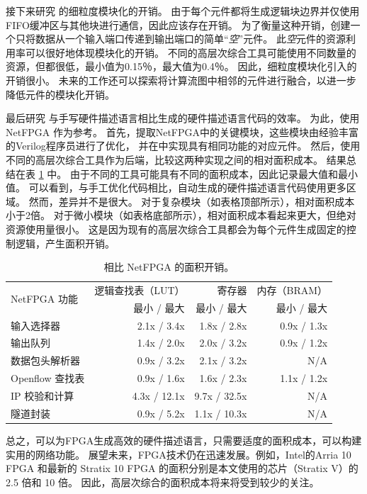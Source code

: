 接下来研究 \name 的细粒度模块化的开销。
由于每个元件都将生成逻辑块边界并仅使用FIFO缓冲区与其他块进行通信，因此应该存在开销。
为了衡量这种开销，创建一个只将数据从一个输入端口传递到输出端口的简单``\textit{空}''元件。
此\textit {空}元件的资源利用率可以很好地体现模块化的开销。
不同的高层次综合工具可能使用不同数量的资源，但都很低，最小值为0.15％，最大值为0.4％。
因此，细粒度模块化引入的开销很小。
未来的工作还可以探索将计算流图中相邻的元件进行融合，以进一步降低元件的模块化开销。

最后研究 \name 与手写硬件描述语言相比生成的硬件描述语言代码的效率。
为此，使用NetFPGA \cite {netfpga}作为参考。
首先，提取NetFPGA中的关键模块，这些模块由经验丰富的Verilog程序员进行了优化，
并在\name 中实现具有相同功能的对应元件。
然后，使用不同的高层次综合工具作为后端，比较这两种实现之间的相对面积成本。
结果总结在表 \ref {clicknp:tab:netfpga} 中。
由于不同的工具可能具有不同的面积成本，因此记录最大值和最小值。
可以看到，与手工优化代码相比，自动生成的硬件描述语言代码使用更多区域。
然而，差异并不是很大。
对于复杂模块（如表格顶部所示），相对面积成本小于2倍。
对于微小模块（如表格底部所示），相对面积成本看起来更大，但绝对资源使用量很小。
这是因为现有的高层次综合工具都会为每个元件生成固定的控制逻辑，产生面积开销。



\begin{table}[htbp]
	\centering
	\caption{相比 NetFPGA 的面积开销。}
	\label{clicknp:tab:netfpga}
	\small
		\begin{tabular}{l|r|r|r}
			\toprule
			\multirow{2}{2.2cm}{NetFPGA 功能} & 逻辑查找表（LUT） & 寄存器 & 内存（BRAM） \\
			& 最小 / 最大 & 最小 / 最大 & 最小 / 最大 \\
			\midrule
			输入选择器  & 2.1x / 3.4x & 1.8x / 2.8x & 0.9x / 1.3x \\
			输出队列   & 1.4x / 2.0x & 2.0x / 3.2x & 0.9x / 1.2x \\
			数据包头解析器  & 0.9x / 3.2x & 2.1x / 3.2x & N/A \\
			Openflow 查找表 & 0.9x / 1.6x & 1.6x / 2.3x & 1.1x / 1.2x \\
			\midrule
			\midrule
			IP 校验和计算    & 4.3x / 12.1x & 9.7x / 32.5x & N/A \\
			隧道封装          & 0.9x / 5.2x & 1.1x / 10.3x & N/A \\
			\bottomrule
		\end{tabular}
\end{table}

总之，\name 可以为FPGA生成高效的硬件描述语言，只需要适度的面积成本，可以构建实用的网络功能。
展望未来，FPGA技术仍在迅速发展。例如，Intel的Arria 10 FPGA 和最新的 Stratix 10 FPGA 的面积分别是本文使用的芯片（Stratix V）的 2.5 倍和 10 倍。
因此，高层次综合的面积成本将来将受到较少的关注。

